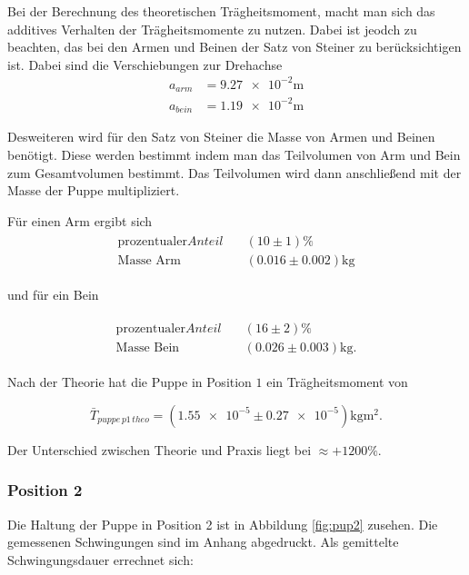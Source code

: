 Bei der Berechnung des theoretischen Trägheitsmoment, macht man sich das additives Verhalten der Trägheitsmomente zu nutzen.
Dabei ist jeodch zu beachten, das bei den Armen und Beinen der Satz von Steiner zu berücksichtigen ist. Dabei sind die Verschiebungen zur Drehachse
\begin{align*}
a_{arm}&=\num{9.27e-2}\si{\meter}\\
a_{bein}&=\num{1.19e-2}\si{\meter}
\end{align*}

Desweiteren wird für den Satz von Steiner die Masse von Armen und Beinen benötigt.
Diese werden bestimmt indem man das Teilvolumen von Arm und Bein zum Gesamtvolumen bestimmt. 
Das Teilvolumen wird dann anschließend mit der Masse der Puppe multipliziert.

Für einen Arm ergibt sich
\begin{align}
\begin{aligned}
\label{eq:masse_arm}
\text{prozentualer} Anteil \quad &\left(10\pm\num{1}\right)\% \\
\text{Masse Arm} \quad &\left(\num{0.016}\pm\num{0.002}\right)\si{\kilogram}
\end{aligned}
\end{align}

und für ein Bein

\begin{align}
\begin{aligned}
\label{eq:masse_bein}
\text{prozentualer} Anteil \quad &\left(16\pm\num{2}\right)\% \\
\text{Masse Bein} \quad &\left(\num{0.026}\pm\num{0.003}\right)\si{\kilogram}.
\end{aligned}
\end{align}

Nach der Theorie hat die Puppe in Position $1$ ein Trägheitsmoment von

\begin{equation*}
\bar{T}_{puppe\, p1\,theo}=\left(\num{1.55e-5}\pm\num{0.27e-5}\right) \si{\kilogram\meter\squared}.
\end{equation*}

Der Unterschied zwischen Theorie und Praxis liegt bei $\approx +1200 \%$.

\subsubsection{Position 2}
Die Haltung der Puppe in Position 2 ist in Abbildung \ref{fig:pup2} zusehen.
Die gemessenen Schwingungen sind im Anhang abgedruckt.
Als gemittelte Schwingungsdauer errechnet sich:


